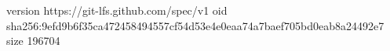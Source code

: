 version https://git-lfs.github.com/spec/v1
oid sha256:9efd9b6f35ca472458494557cf54d53e4e0eaa74a7baef705bd0eab8a24492e7
size 196704
